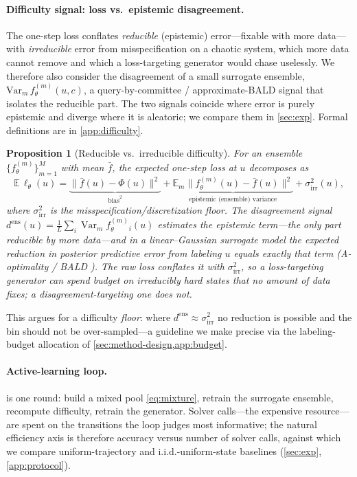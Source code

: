 \documentclass{article}
\theoremstyle{plain}
\newtheorem{proposition}{Proposition}
\theoremstyle{definition}
\theoremstyle{remark}
\DeclareMathOperator{\Var}{Var}
\newcommand{\E}{\mathbb{E}}
\newcommand{\state}{u}
\newcommand{\param}{c}
\newcommand{\sol}{\Phi}
\newcommand{\surr}{f_\theta}
\newcommand{\lossf}{\ell_\theta}
\begin{document}
\paragraph{Difficulty signal: loss vs.\ epistemic disagreement.}
The one-step loss conflates \emph{reducible} (epistemic) error---fixable with more data---with
\emph{irreducible} error from misspecification on a chaotic system, which more data cannot remove and
which a loss-targeting generator would chase uselessly. We therefore also consider the disagreement of a
small surrogate ensemble, $\mathrm{Var}_m\,\surr^{(m)}(\state,\param)$, a query-by-committee /
approximate-BALD signal \citep{houlsby2011bald,beluch2018ensembles} that isolates the reducible part. The
two signals coincide where error is purely epistemic and diverge where it is aleatoric; we compare them
in \cref{sec:exp}. Formal definitions are in \cref{app:difficulty}.
\begin{proposition}[Reducible vs.\ irreducible difficulty]\label{prop:difficulty}
For an ensemble $\{\surr^{(m)}\}_{m=1}^M$ with mean $\bar f$, the expected one-step loss at $\state$
decomposes as
\[
  \E\,\lossf(\state)=\underbrace{\|\bar f(\state)-\sol(\state)\|^2}_{\text{bias}^2}
  +\underbrace{\E_m\|\surr^{(m)}(\state)-\bar f(\state)\|^2}_{\text{epistemic (ensemble) variance}}
  +\sigma^2_{\mathrm{irr}}(\state),
\]
where $\sigma^2_{\mathrm{irr}}$ is the misspecification/discretization floor. The disagreement signal
$d^{\mathrm{ens}}(\state)=\tfrac1L\sum_i\Var_m\surr^{(m)}_i(\state)$ estimates the epistemic term---the
only part reducible by more data---and in a linear--Gaussian surrogate model the expected reduction in
posterior predictive error from labeling $\state$ equals exactly that term (A-optimality / BALD
\citep{houlsby2011bald,beluch2018ensembles}). The raw loss conflates it with $\sigma^2_{\mathrm{irr}}$, so a
loss-targeting generator can spend budget on irreducibly hard states that no amount of data fixes; a
disagreement-targeting one does not.
\end{proposition}
This argues for a difficulty \emph{floor}: where $d^{\mathrm{ens}}\!\approx\!\sigma^2_{\mathrm{irr}}$ no
reduction is possible and the bin should not be over-sampled---a guideline we make precise via the
labeling-budget allocation of \cref{sec:method-design,app:budget}.

\paragraph{Active-learning loop.}
 is one round: build a mixed pool \eqref{eq:mixture}, retrain the surrogate ensemble,
recompute difficulty, retrain the generator. Solver calls---the expensive resource---are spent on the
transitions the loop judges most informative; the natural efficiency axis is therefore accuracy versus
number of solver calls, against which we compare uniform-trajectory and i.i.d.-uniform-state baselines
(\cref{sec:exp}, \cref{app:protocol}).
\end{document}
